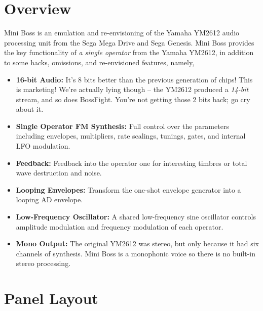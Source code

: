 \documentclass[12pt,letter]{article}
\begin{document}


\section{Overview}

Mini Boss is an emulation and re-envisioning of the Yamaha YM2612 audio processing unit from the Sega Mega Drive and Sega Genesis. Mini Boss provides the key functionality of \textit{a single operator} from the Yamaha YM2612, in addition to some hacks, omissions, and re-envisioned features, namely,
\begin{itemize}
  \item \textbf{16-bit Audio:} It's 8 bits better than the previous generation of chips! This is marketing! We're actually lying though -- the YM2612 produced a \textit{14-bit} stream, and so does BossFight. You're not getting those 2 bits back; go cry about it.
  \item \textbf{Single Operator FM Synthesis:} Full control over the parameters including envelopes, multipliers, rate scalings, tunings, gates, and internal LFO modulation.
  \item \textbf{Feedback:} Feedback into the operator one for interesting timbres or total wave destruction and noise.
  \item \textbf{Looping Envelopes:} Transform the one-shot envelope generator into a looping AD envelope.
  \item \textbf{Low-Frequency Oscillator:} A shared low-frequency sine oscillator controls amplitude modulation and frequency modulation of each operator.
  \item \textbf{Mono Output:} The original YM2612 was stereo, but only because it had six channels of synthesis. Mini Boss is a monophonic voice so there is no built-in stereo processing.
\end{itemize}


\clearpage
\section{Panel Layout}
\end{document}
